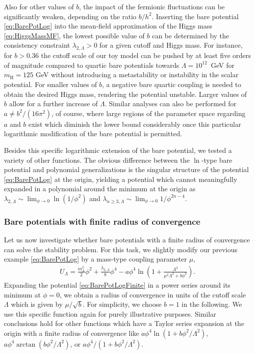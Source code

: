 \documentclass[twocolumn,aps,prd,showpacs,nofootinbib,superscriptaddress,preprintnumbers,floatfix,10pt]{revtex4-1}
\newcommand{\UL}{U_{\Lambda}}
\newcommand{\mL}{m_\Lambda^2}
\newcommand{\lL}{\lambda_{2,\Lambda}}
\newcommand{\mH}{m_{\text{H}}}
\begin{document}
Also for other values of $b$, the impact of the fermionic fluctuations can be significantly weaken, depending on the ratio $b/h^{2}$. 
Inserting the bare potential \eqref{eq:BarePotLog} into the mean-field approximation of the Higgs mass \eqref{eq:HiggsMassMF}, the lowest possible value of $b$ can be determined by the consistency constraint $\lL>0$ for a given cutoff and Higgs mass. For instance, for $b>0.36$ the cutoff scale of our toy model can be pushed by at least five orders of magnitude compared to quartic bare potentials towards $\Lambda = 10^{12}$~GeV for $\mH = 125$ GeV without introducing a metastability or instability in the scalar potential. For smaller values of $b$, a negative bare quartic coupling is needed to obtain the desired Higgs mass, rendering the potential unstable. 
Larger values of $b$ allow for a further increase of $\Lambda$.
Similar analyses can also be performed for $a \neq b^{2}/(16\pi^{2})$, of course, where large regions of the parameter space regarding $a$ and $b$ exist which diminish the lower bound considerably once this particular logarithmic modification of the bare potential is permitted.


Besides this specific logarithmic extension of the bare potential, we tested a variety of other functions. 
The obvious difference between the $\ln$-type bare potential and polynomial generalizations is the singular structure of the potential \eqref{eq:BarePotLog} at the origin, yielding a potential which cannot meaningfully expanded in a polynomial around the minimum at the origin as $\lL \sim \lim_{\phi \to 0} \ln(1/\phi^{2})$ and ${\lambda_{n\geq 3,\Lambda} \sim \lim_{\phi\to 0} 1/\phi^{2n-4}}$. 



\subsubsection{Bare potentials with finite radius of convergence}
Let us now investigate whether bare potentials with a finite radius of convergence can solve the stability problem. For this task, we slightly modify our previous example \eqref{eq:BarePotLog} by a mass-type coupling parameter $\mu$,
%
\begin{align}
 \UL = \frac{\mL}{2}\phi^{2} + \frac{\lL}{8}\phi^{4} - a \phi^{4} \ln \left(1+ \frac{\Lambda^{2}}{\mu^{2}\Lambda^{2} + b\phi^{2}} \right).
 \label{eq:BarePotLogFinite}
\end{align}
%
Expanding the potential \eqref{eq:BarePotLogFinite} in a power series around its minimum at $\phi=0$, we obtain a radius of convergence in units of the cutoff scale $\Lambda$ which is given by $\mu/\sqrt{b}$. For simplicity, we choose $b=1$ in the following.
We use this specific function again for purely illustrative purposes. Similar conclusions hold for other functions which have a Taylor series expansion at the origin with a finite radius of convergence like $a \phi^{4} \ln(1+b\phi^{2}/\Lambda^{2})$, $a \phi^{4} \arctan{(b\phi^{2}/\Lambda^{2})}$, or $a\phi^{4}/(1+b\phi^{2}/\Lambda^{2})$. 
\end{document}
